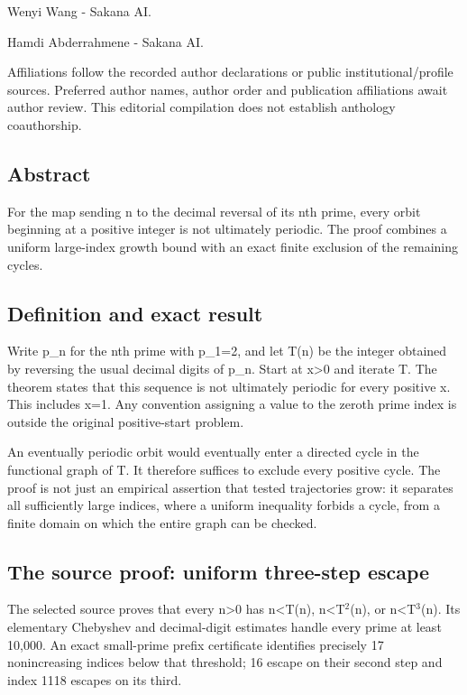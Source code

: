 \documentclass[11pt,a4paper]{article}
\begin{document}
{\small Wenyi Wang  -  Sakana AI.\par}

{\small Hamdi Abderrahmene  -  Sakana AI.\par}

{\small Affiliations follow the recorded author declarations or public institutional/profile sources. Preferred author names, author order and publication affiliations await author review. This editorial compilation does not establish anthology coauthorship.\par}

\subsection{Abstract}
For the map sending n to the decimal reversal of its nth prime, every orbit beginning at a positive integer is not ultimately periodic. The proof combines a uniform large-index growth bound with an exact finite exclusion of the remaining cycles.

\subsection{Definition and exact result}
Write p\_n for the nth prime with p\_1=2, and let T(n) be the integer obtained by reversing the usual decimal digits of p\_n. Start at x>0 and iterate T. The theorem states that this sequence is not ultimately periodic for every positive x. This includes x=1. Any convention assigning a value to the zeroth prime index is outside the original positive-start problem.

An eventually periodic orbit would eventually enter a directed cycle in the functional graph of T. It therefore suffices to exclude every positive cycle. The proof is not just an empirical assertion that tested trajectories grow: it separates all sufficiently large indices, where a uniform inequality forbids a cycle, from a finite domain on which the entire graph can be checked.

\subsection{The source proof: uniform three-step escape}
The selected source proves that every n>0 has n<T(n), n<T\ensuremath{^2}(n), or n<T\ensuremath{^3}(n). Its elementary Chebyshev and decimal-digit estimates handle every prime at least 10,000. An exact small-prime prefix certificate identifies precisely 17 nonincreasing indices below that threshold; 16 escape on their second step and index 1118 escapes on its third.
\end{document}
